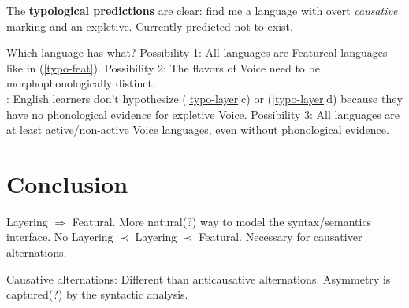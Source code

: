 \ex The \textbf{typological predictions} are clear: find me a language with overt \emph{causative} marking and an expletive. Currently predicted not to exist.
\xe



\pex Which language has what?
	\a Possibility 1: All languages are Featureal languages like in (\ref{typo-feat}).
	\a Possibility 2: The flavors of Voice need to be morphophonologically distinct.\\
		\cite{layering15}: English learners don't hypothesize (\ref{typo-layer}c) or (\ref{typo-layer}d) because they have no phonological evidence for expletive Voice.
	\a Possibility 3: All languages are at least active/non-active Voice languages, even without phonological evidence.
\xe



\section{Conclusion}
\pex Layering $\Rightarrow$ Featural.
	\a More natural(?) way to model the syntax/semantics interface.
	\a No Layering $\prec$ Layering $\prec$ Featural.
	\a Necessary for causativer alternations.
\xe

\pex Causative alternations:
	\a Different than anticausative alternations.
	\a Asymmetry is captured(?) by the syntactic analysis.
\xe